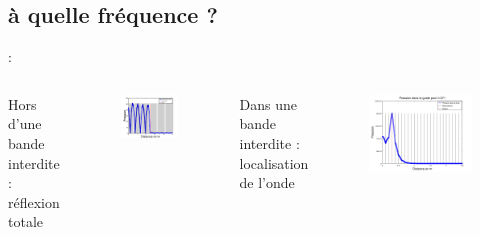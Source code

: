 \documentclass[12pt,xcolor=x11names,compress, notes=show]{beamer}%
\begin{document}
\subsection{à quelle fréquence ?}
\begin{frame}{\insertsectionhead : \insertsubsectionhead}
\begin{columns}[T]
	 Hors d'une bande interdite : réflexion totale 
	\begin{figure}
		\centering
		\includegraphics[width=\textwidth]{horsbande_50RH_500Hz_71mm.png}
	\end{figure}
	
	 Dans une bande interdite : localisation de l'onde
	\begin{figure}
		\centering
		\includegraphics[width=\textwidth]{visu_pression_favo2.png}
	\end{figure}
\end{columns}
\end{frame}
\end{document}
